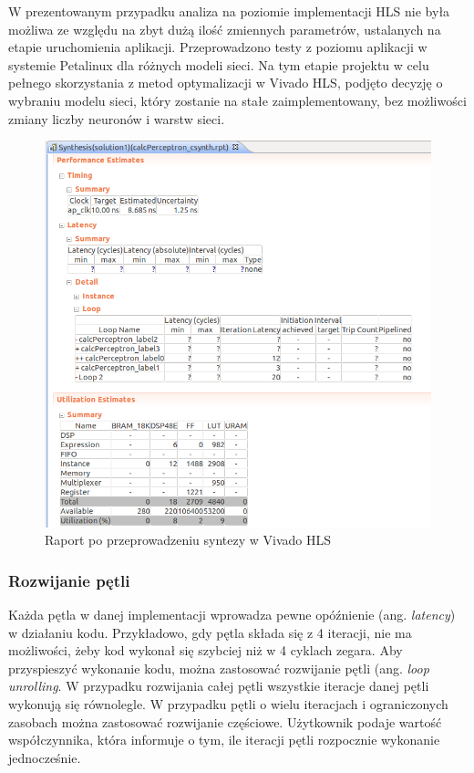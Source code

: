 W prezentowanym przypadku analiza na poziomie implementacji HLS nie była możliwa ze względu na zbyt dużą ilość zmiennych parametrów, ustalanych na etapie uruchomienia aplikacji. Przeprowadzono testy z poziomu aplikacji w systemie Petalinux dla różnych modeli sieci. Na tym etapie projektu w celu pełnego skorzystania z metod optymalizacji w Vivado HLS, podjęto decyzję o wybraniu modelu sieci, który zostanie na stałe zaimplementowany, bez możliwości zmiany liczby neuronów i warstw sieci.


\begin{figure}[!h]
  \centering
  \includegraphics[width=\textwidth]{img/hls-report.png}
  \caption{Raport po przeprowadzeniu syntezy w Vivado HLS}
  \label{hls-report}
\end{figure}


\subsubsection{Rozwijanie pętli}

Każda pętla w danej implementacji wprowadza pewne opóźnienie (ang. \emph{latency}) w działaniu kodu. Przykładowo, gdy pętla składa się z 4 iteracji, nie ma możliwości, żeby kod wykonał się szybciej niż w 4 cyklach zegara. Aby przyspieszyć wykonanie kodu, można zastosować rozwijanie pętli (ang. \emph{loop unrolling}. W przypadku rozwijania całej pętli wszystkie iteracje danej pętli wykonują się równolegle. W przypadku pętli o wielu iteracjach i ograniczonych zasobach można zastosować rozwijanie częściowe. Użytkownik podaje wartość współczynnika, która informuje o tym, ile iteracji pętli rozpocznie wykonanie jednocześnie.

